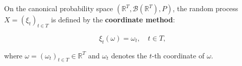 On the canonical probability space $(\mathbb{R}^T, \mathcal{B}(\mathbb{R}^T), P)$, the random process $X = (\xi_t)_{t \in T}$ is defined by the \textbf{coordinate method}:

$$\xi_t(\omega) = \omega_t, \quad t \in T,$$

where $\omega = (\omega_t)_{t \in T} \in \mathbb{R}^T$ and $\omega_t$ denotes the $t$-th coordinate of $\omega$.
